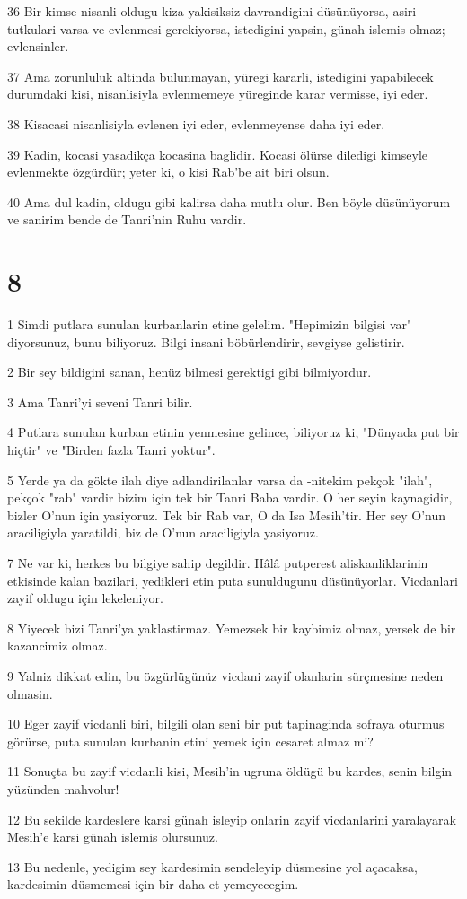\par 36 Bir kimse nisanli oldugu kiza yakisiksiz davrandigini düsünüyorsa, asiri tutkulari varsa ve evlenmesi gerekiyorsa, istedigini yapsin, günah islemis olmaz; evlensinler.
\par 37 Ama zorunluluk altinda bulunmayan, yüregi kararli, istedigini yapabilecek durumdaki kisi, nisanlisiyla evlenmemeye yüreginde karar vermisse, iyi eder.
\par 38 Kisacasi nisanlisiyla evlenen iyi eder, evlenmeyense daha iyi eder.
\par 39 Kadin, kocasi yasadikça kocasina baglidir. Kocasi ölürse diledigi kimseyle evlenmekte özgürdür; yeter ki, o kisi Rab'be ait biri olsun.
\par 40 Ama dul kadin, oldugu gibi kalirsa daha mutlu olur. Ben böyle düsünüyorum ve sanirim bende de Tanri'nin Ruhu vardir.

\chapter{8}

\par 1 Simdi putlara sunulan kurbanlarin etine gelelim. "Hepimizin bilgisi var" diyorsunuz, bunu biliyoruz. Bilgi insani böbürlendirir, sevgiyse gelistirir.
\par 2 Bir sey bildigini sanan, henüz bilmesi gerektigi gibi bilmiyordur.
\par 3 Ama Tanri'yi seveni Tanri bilir.
\par 4 Putlara sunulan kurban etinin yenmesine gelince, biliyoruz ki, "Dünyada put bir hiçtir" ve "Birden fazla Tanri yoktur".
\par 5 Yerde ya da gökte ilah diye adlandirilanlar varsa da -nitekim pekçok "ilah", pekçok "rab" vardir bizim için tek bir Tanri Baba vardir. O her seyin kaynagidir, bizler O'nun için yasiyoruz. Tek bir Rab var, O da Isa Mesih'tir. Her sey O'nun araciligiyla yaratildi, biz de O'nun araciligiyla yasiyoruz.
\par 7 Ne var ki, herkes bu bilgiye sahip degildir. Hâlâ putperest aliskanliklarinin etkisinde kalan bazilari, yedikleri etin puta sunuldugunu düsünüyorlar. Vicdanlari zayif oldugu için lekeleniyor.
\par 8 Yiyecek bizi Tanri'ya yaklastirmaz. Yemezsek bir kaybimiz olmaz, yersek de bir kazancimiz olmaz.
\par 9 Yalniz dikkat edin, bu özgürlügünüz vicdani zayif olanlarin sürçmesine neden olmasin.
\par 10 Eger zayif vicdanli biri, bilgili olan seni bir put tapinaginda sofraya oturmus görürse, puta sunulan kurbanin etini yemek için cesaret almaz mi?
\par 11 Sonuçta bu zayif vicdanli kisi, Mesih'in ugruna öldügü bu kardes, senin bilgin yüzünden mahvolur!
\par 12 Bu sekilde kardeslere karsi günah isleyip onlarin zayif vicdanlarini yaralayarak Mesih'e karsi günah islemis olursunuz.
\par 13 Bu nedenle, yedigim sey kardesimin sendeleyip düsmesine yol açacaksa, kardesimin düsmemesi için bir daha et yemeyecegim.

